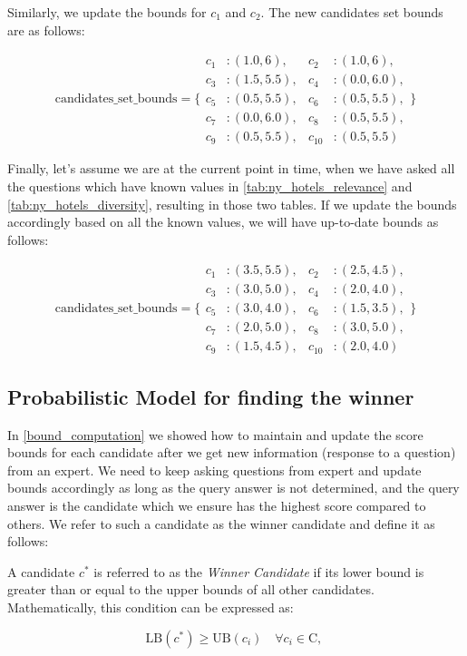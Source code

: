 \begin{example}
Similarly, we update the bounds for \( c_{1} \) and \( c_{2} \). The new candidates set bounds are as follows:

\[
\text{candidates\_set\_bounds} = \{ 
\begin{aligned}
c_1 &: (1.0, 6), & c_2 &: (1.0, 6), \\
c_3 &: (1.5, 5.5), & c_4 &: (0.0, 6.0), \\
c_5 &: (0.5, 5.5), & c_6 &: (0.5, 5.5), \\
c_7 &: (0.0, 6.0), & c_8 &: (0.5, 5.5), \\
c_9 &: (0.5, 5.5), & c_{10} &: (0.5, 5.5)
\end{aligned}
\}
\]

Finally, let's assume we are at the current point in time, when we have asked all the questions which have known values in \autoref{tab:ny_hotels_relevance} and \autoref{tab:ny_hotels_diversity}, resulting in those two tables. If we update the bounds accordingly based on all the known values, we will have up-to-date bounds as follows:

\[
\text{candidates\_set\_bounds} = \{ 
\begin{aligned}
c_1 &: (3.5, 5.5), & c_2 &: (2.5, 4.5), \\
c_3 &: (3.0, 5.0), & c_4 &: (2.0, 4.0), \\
c_5 &: (3.0, 4.0), & c_6 &: (1.5, 3.5), \\
c_7 &: (2.0, 5.0), & c_8 &: (3.0, 5.0), \\
c_9 &: (1.5, 4.5), & c_{10} &: (2.0, 4.0)
\end{aligned}
\}
\]

\end{example}


\subsection{Probabilistic Model for finding the winner}
\label{winning_probability}

In \autoref{bound_computation} we showed how to maintain and update the score bounds for each candidate after we get new information (response to a question) from an expert. We need to keep asking questions from expert and update bounds accordingly as long as the query answer is not determined, and the query answer is the candidate which we ensure has the highest score compared to others. We refer to such a candidate as the winner candidate and define it as follows:

\begin{definition}
A candidate \( c^* \) is referred to as the \textit{Winner Candidate} if its lower bound is greater than or equal to the upper bounds of all other candidates. Mathematically, this condition can be expressed as:

\[
\text{LB}(c^*) \geq \text{UB}(c_i) \quad \forall c_i \in \text{C}, \
\]

\end{definition}

